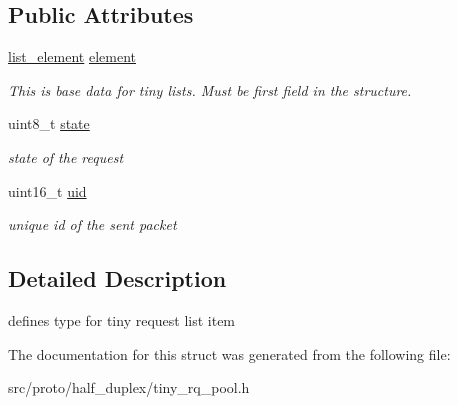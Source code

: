 \subsection*{Public Attributes}
\begin{DoxyCompactItemize}
\item 
\mbox{\label{structtiny__request___a02c8fb6d26d0cfb0264423a1cb643159}} 
\hyperlink{structlist__element__}{list\+\_\+element} \hyperlink{structtiny__request___a02c8fb6d26d0cfb0264423a1cb643159}{element}
\begin{DoxyCompactList}\small\item\em This is base data for tiny lists. Must be first field in the structure. \end{DoxyCompactList}\item 
\mbox{\label{structtiny__request___a019207b55569a48a82a2922dd3cc7eb2}} 
uint8\+\_\+t \hyperlink{structtiny__request___a019207b55569a48a82a2922dd3cc7eb2}{state}
\begin{DoxyCompactList}\small\item\em state of the request \end{DoxyCompactList}\item 
\mbox{\label{structtiny__request___aefa85d07e09d6772963532b6cf1ed125}} 
uint16\+\_\+t \hyperlink{structtiny__request___aefa85d07e09d6772963532b6cf1ed125}{uid}
\begin{DoxyCompactList}\small\item\em unique id of the sent packet \end{DoxyCompactList}\end{DoxyCompactItemize}


\subsection{Detailed Description}
defines type for tiny request list item 

The documentation for this struct was generated from the following file\+:\begin{DoxyCompactItemize}
\item 
src/proto/half\+\_\+duplex/tiny\+\_\+rq\+\_\+pool.\+h\end{DoxyCompactItemize}
